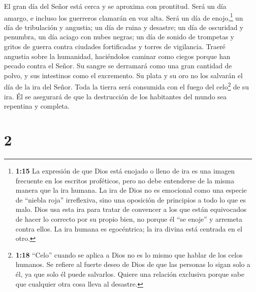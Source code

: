  El gran día del Señor está cerca y se aproxima con
prontitud. Será un día amargo, e incluso los guerreros clamarán en voz
alta.  Será un día de enojo,\footnote{\textbf{1:15} La
  expresión de que Dios está enojado o lleno de ira es una imagen
  frecuente en los escritos proféticos, pero no debe entenderse de la
  misma manera que la ira humana. La ira de Dios no es emocional como
  una especie de ``niebla roja'' irreflexiva, sino una oposición de
  principios a todo lo que es malo. Dios usa esta ira para tratar de
  convencer a los que están equivocados de hacer lo correcto por su
  propio bien, no porque él ``se enoje'' y arremeta contra ellos. La ira
  humana es egocéntrica; la ira divina está centrada en el otro.} un día
de tribulación y angustia; un día de ruina y desastre; un día de
oscuridad y penumbra, un día aciago con nubes negras;  un
día de sonido de trompetas y gritos de guerra contra ciudades
fortificadas y torres de vigilancia.  Traeré angustia sobre
la humanidad, haciéndolos caminar como ciegos porque han pecado contra
el Señor. Su sangre se derramará como una gran cantidad de polvo, y sus
intestinos como el excremento.  Su plata y su oro no los
salvarán el día de la ira del Señor. Toda la tierra será consumida con
el fuego del celo\footnote{\textbf{1:18} ``Celo'' cuando se aplica a
  Dios no es lo mismo que hablar de los celos humanos. Se refiere al
  fuerte deseo de Dios de que las personas lo sigan solo a él, ya que
  solo él puede salvarlos. Quiere una relación exclusiva porque sabe que
  cualquier otra cosa lleva al desastre.} de su ira. Él se asegurará de
que la destrucción de los habitantes del mundo sea repentina y completa.

\hypertarget{section-1}{%
\section{2}\label{section-1}}

